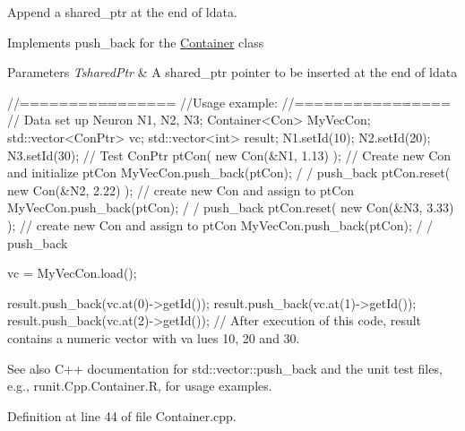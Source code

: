 Append a shared\_\-ptr at the end of ldata. 

Implements push\_\-back for the \hyperlink{classvec_a_m_o_r_e}{Container} class 
\begin{DoxyParams}{Parameters}
{\em TsharedPtr} & A shared\_\-ptr pointer to be inserted at the end of ldata\\
\hline
\end{DoxyParams}

\begin{DoxyCode}
                //================
                //Usage example:
                //================
                // Data set up
                        Neuron N1, N2, N3;
                        Container<Con> MyVecCon;
                        std::vector<ConPtr> vc;
                        std::vector<int> result;
                        N1.setId(10);
                        N2.setId(20);
                        N3.setId(30);
                // Test
                        ConPtr ptCon( new Con(&N1, 1.13) );       // Create
       new Con and initialize ptCon
                        MyVecCon.push_back(ptCon);                              /
      / push_back
                        ptCon.reset(  new Con(&N2, 2.22) );             // create
       new Con and assign to ptCon
                        MyVecCon.push_back(ptCon);                              /
      / push_back
                        ptCon.reset(  new Con(&N3, 3.33) );             // create
       new Con and assign to ptCon
                        MyVecCon.push_back(ptCon);                              /
      / push_back

                        vc = MyVecCon.load();

                        result.push_back(vc.at(0)->getId());
                        result.push_back(vc.at(1)->getId());
                        result.push_back(vc.at(2)->getId());
        // After execution of this code, result contains a numeric vector with va
      lues 10, 20 and 30.
\end{DoxyCode}


\begin{DoxySeeAlso}{See also}
C++ documentation for std::vector::push\_\-back and the unit test files, e.g., runit.Cpp.Container.R, for usage examples. 
\end{DoxySeeAlso}


Definition at line 44 of file Container.cpp.


